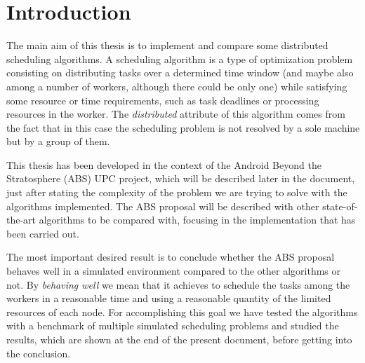 
\chapter{Introduction} %

\label{Chapter1} %


\newcommand{\keyword}[1]{\textbf{#1}}
\newcommand{\tabhead}[1]{\textbf{#1}}
\newcommand{\code}[1]{\texttt{#1}}
\newcommand{\file}[1]{\texttt{\bfseries#1}}
\newcommand{\option}[1]{\texttt{\itshape#1}}

The main aim of this thesis is to implement and compare some distributed scheduling algorithms. A scheduling algorithm is a type of optimization problem consisting on distributing tasks over a determined time window (and maybe also among a number of workers, although there could be only one) while satisfying some resource or time requirements, such as task deadlines or processing resources in the worker. The \emph{distributed} attribute of this algorithm comes from the fact that in this case the scheduling problem is not resolved by a sole machine but by a group of them.

This thesis has been developed in the context of the Android Beyond the Stratosphere (ABS) UPC project, which will be described later in the document, just after stating the complexity of the problem we are trying to solve with the algorithms implemented. The ABS proposal will be described with other state-of-the-art algorithms to be compared with, focusing in the implementation that has been carried out. 

The most important desired result is to conclude whether the ABS proposal behaves well in a simulated environment compared to the other algorithms or not. By \emph{behaving well} we mean that it achieves to schedule the tasks among the workers in a reasonable time and using a reasonable quantity of the limited resources of each node. For accomplishing this goal we have tested the algorithms with a benchmark of multiple simulated scheduling problems and studied the results, which are shown at the end of the present document, before getting into the conclusion.

